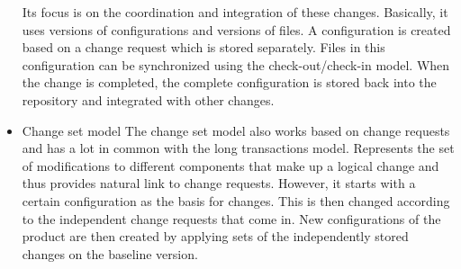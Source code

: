 \documentclass{article}
\begin{document}
\begin{itemize}
    Its focus is on the coordination and integration of these changes. Basically, it uses versions of configurations and versions of files.
    A configuration is created based on a change request which is stored separately. Files in this configuration can be synchronized using the check-out/check-in model.
    When the change is completed, the complete configuration is stored back into the repository and integrated with other changes.
    \item Change set model
    The change set model also works based on change requests and has a lot in common with the long transactions model. Represents the set of modifications to different components that make up
    a logical change and thus provides natural link to change requests. However, it starts with a certain configuration as the basis for changes.
    This is then changed according to the independent change requests that come in.
    New configurations of the product are then created by applying sets of the independently stored changes on the baseline version.
\end{itemize}
\end{document}
